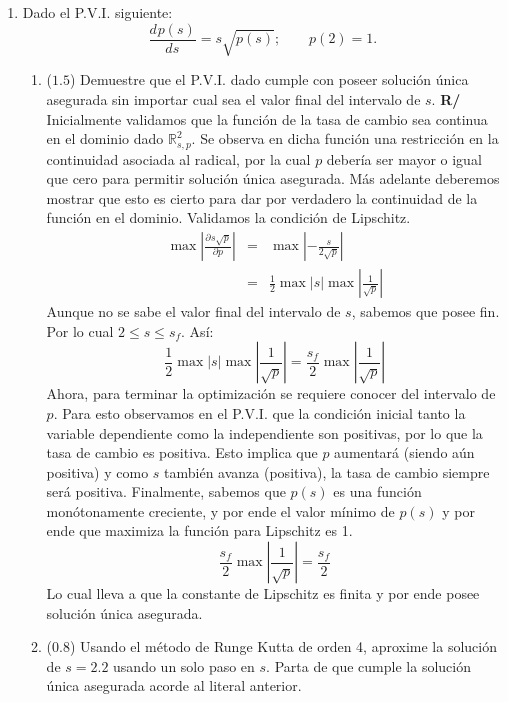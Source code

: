 \documentclass[12pt]{article}
\newcommand{\R}{\ensuremath{\mathbb{R}}}
\newcommand{\diff}[3]{\frac{d^{#3} #1}{d#2^{#3}}}
\newcommand{\pdiff}[3]{\frac{\partial^{#3} #1}{\partial#2^{#3}}}
\begin{document}
\vspace{-.5cm}
  \begin{enumerate}[leftmargin=*,widest=9]
    \item Dado el P.V.I. siguiente:
    \[
      \diff{p(s)}{s}{} = s\sqrt{p(s)};\qquad
      p(2) = 1.
    \]
    \begin{enumerate}[label=\alph*]
    \item (\(1.5\)) Demuestre que el P.V.I. dado cumple con poseer solución única asegurada sin importar cual sea el valor final del intervalo de \(s\).
    \textbf{R/} Inicialmente validamos que la función de la tasa de cambio sea continua en el dominio dado \(\R^2_{s,p}\). Se observa en dicha función una restricción en la continuidad asociada al radical, por la cual \(p\) debería ser mayor o igual que cero para permitir solución única asegurada. Más adelante deberemos mostrar que esto es cierto para dar por verdadero la continuidad de la función en el dominio.
    Validamos la condición de Lipschitz.
    \begin{eqnarray*}
\max \left\vert \pdiff{s\sqrt{p}}{p}{} \right\vert &= &\max \left\vert -\frac{s}{2\sqrt{p}}\right\vert\\
& = & \frac{1}{2}\max \vert s\vert \max \left\vert \frac{1}{\sqrt{p}} \right\vert
    \end{eqnarray*}
    Aunque no se sabe el valor final del intervalo de \(s\), sabemos que posee fin. Por lo cual \(2 \leq s \leq s_f\). Así:
    \[
\frac{1}{2}\max \vert s\vert \max \left\vert \frac{1}{\sqrt{p}} \right\vert = \frac{s_f}{2}\max\left\vert \frac{1}{\sqrt{p}} \right\vert
    \]
Ahora, para terminar la optimización se requiere conocer del intervalo de \(p\). Para esto observamos en el P.V.I. que la condición inicial tanto la variable dependiente como la independiente son positivas, por lo que la tasa de cambio es positiva. Esto implica que \(p\) aumentará (siendo aún positiva) y como \(s\) también avanza (positiva), la tasa de cambio siempre será positiva.
Finalmente, sabemos que \(p(s)\) es una función monótonamente creciente, y por ende el valor mínimo de \(p(s)\) y por ende que maximiza la función para Lipschitz es 1.
\[
\frac{s_f}{2}\max\left\vert \frac{1}{\sqrt{p}} \right\vert = \frac{s_f}{2}
\]
Lo cual lleva a que la constante de Lipschitz es finita y por ende posee solución única asegurada.
    \item (\(0.8\)) Usando el método de Runge Kutta de orden 4, aproxime la solución de \(s=2.2\) usando un solo paso en \(s\). Parta de que cumple la solución única asegurada acorde al literal anterior.

\end{enumerate}
\end{enumerate}
\end{document}
